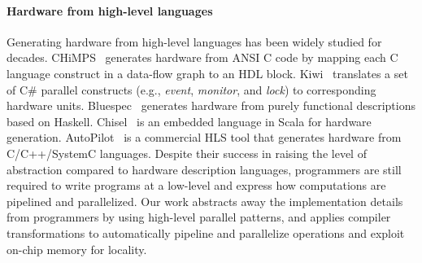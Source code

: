 

\paragraph{Hardware from high-level languages}
Generating hardware from high-level languages has been widely studied for
decades.  CHiMPS~\cite{chimps} generates hardware from ANSI C code by
mapping each C language construct in a data-flow graph to an HDL block.
Kiwi~\cite{kiwi} translates a set of C\# parallel constructs (e.g.,
\emph{event}, \emph{monitor}, and \emph{lock}) to corresponding hardware units.
Bluespec~\cite{bluespec} generates hardware from purely functional descriptions
based on Haskell.  Chisel~\cite{chisel} is an embedded language in Scala
for hardware generation.  AutoPilot~\cite{autopilot} is a commercial HLS
tool that generates hardware from C/C++/SystemC languages.  Despite their
success in raising the level of abstraction compared to hardware description
languages, programmers are still required to write programs at a low-level and
express how computations are pipelined and parallelized. Our work
abstracts away the implementation details from programmers by using high-level
parallel patterns, and applies compiler transformations to
automatically pipeline and parallelize operations and exploit on-chip memory
for locality.

